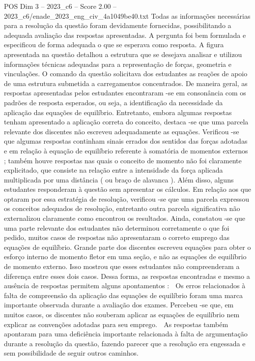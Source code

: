 \begin{textsample}{POS Dim 3 – 2023\_c6 – Score 2.00 – 2023\_c6/enade\_2023\_eng\_civ\_4a1049be40.txt}
Todas as informações necessárias para a resolução da questão foram devidamente fornecidas, possibilitando a adequada avaliação das respostas apresentadas.
A pergunta foi bem formulada e especificou de forma adequada o que se esperava como resposta.
A figura apresentada na questão detalhou a estrutura que se desejava analisar e utilizou informações técnicas adequadas para a representação de forças, geometria e vinculações.
O comando da questão solicitava dos estudantes as reações de apoio de uma estrutura submetida a carregamentos concentrados.
De maneira geral, as respostas apresentadas pelos estudantes encontraram -se em consonância com os padrões de resposta esperados, ou seja, a identificação da necessidade da aplicação das equações de equilíbrio.
Entretanto, embora algumas respostas tenham apresentado a aplicação correta do conceito, destaca -se que uma parcela relevante dos discentes não escreveu adequadamente as equações.
Verificou -se que algumas respostas continham sinais errados dos sentidos das forças adotadas e em relação à equação de equilíbrio referente à somatória de momentos externos ; também houve respostas nas quais o conceito de momento não foi claramente explicitado, que consiste na relação entre a intensidade da força aplicada multiplicada por uma distância ( ou braço de alavanca ).
Além disso, alguns estudantes responderam à questão sem apresentar os cálculos.
Em relação aos que optaram por essa estratégia de resolução, verificou -se que uma parcela expressou os conceitos adequados de resolução, entretanto outra parcela significativa não externalizou claramente como encontrou os resultados.
Ainda, constatou -se que uma parte relevante dos estudantes não determinou corretamente o que foi pedido, muitos casos de respostas não apresentaram o correto emprego das equações de equilíbrio.
Grande parte dos discentes escreveu equações para obter o esforço interno de momento fletor em uma seção, e não as equações de equilíbrio de momento externo.
Isso mostrou que esses estudantes não compreenderam a diferença entre esses dois casos.
Dessa forma, as respostas encontradas e mesmo a ausência de respostas permitem alguns apontamentos :  Os erros relacionados à falta de compreensão da aplicação das equações de equilíbrio foram uma marca importante observada durante a avaliação dos exames.
Percebeu -se que, em muitos casos, os discentes não souberam aplicar as equações de equilíbrio nem explicar as convenções adotadas para seu emprego.  As respostas também apontaram para uma deficiência importante relacionada à falta de argumentação durante a resolução da questão, fazendo parecer que a resolução era engessada e sem possibilidade de seguir outros caminhos.

\end{textsample}
